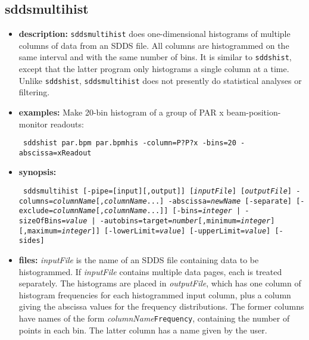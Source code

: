 \newpage
\subsection{sddsmultihist}
\label{sddsmultihist}

\begin{itemize}
\item {\bf description:} 
{\tt sddsmultihist} does one-dimensional histograms of multiple columns of data from an SDDS file.
All columns are histogrammed on the same  interval and with the same number of bins.
It is similar to {\tt sddshist}, except that the latter program only histograms a single
column at a time.  Unlike {\tt sddshist}, {\tt sddsmultihist} does not presently do
statistical analyses or filtering.

\item {\bf examples:} 
Make 20-bin histogram of a group of PAR x beam-position-monitor readouts:
\begin{flushleft}{\tt
sddshist par.bpm par.bpmhis -column=P?P?x -bins=20 -abscissa=xReadout
}\end{flushleft}
\item {\bf synopsis:} 
\begin{flushleft}{\tt
sddsmultihist [-pipe=[input][,output]] [{\em inputFile}] [{\em outputFile}]
-columns={\em columnName}[,{\em columnName}...] -abscissa={\em newName} 
[-separate]
[-exclude={\em columnName}[,{\em columnName}...]]
[{-bins={\em integer} | -sizeOfBins={\em value} | -autobins=target={\em number}[,minimum={\em integer}][,maximum={\em integer}]}]
[-lowerLimit={\em value}] [-upperLimit={\em value}] 
[-sides] 
}\end{flushleft}
\item {\bf files:} {\em inputFile} is the name of an SDDS file
containing data to be histogrammed. If {\em inputFile} contains
multiple data pages, each is treated separately.  The histograms are
placed in {\em outputFile}, which has one column of histogram
frequencies for each histogrammed input column, plus a column giving
the abscissa values for the frequency distributions.  The former
columns have names of the form {\em columnName}{\tt Frequency},
containing the number of points in each bin.  The latter column has a
name given by the user.


\end{itemize}
